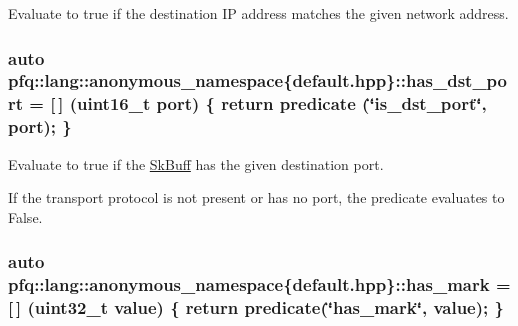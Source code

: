 Evaluate to {\ttfamily true} if the destination IP address matches the given network address. 

\subsubsection[{\texorpdfstring{has\+\_\+dst\+\_\+port}{has_dst_port}}]{\setlength{\rightskip}{0pt plus 5cm}auto pfq\+::lang\+::anonymous\+\_\+namespace\{default.\+hpp\}\+::has\+\_\+dst\+\_\+port = \mbox{[}$\,$\mbox{]} (uint16\+\_\+t {\bf port}) \{ return {\bf predicate} (\char`\"{}is\+\_\+dst\+\_\+port\char`\"{}, port); \}}\hypertarget{namespacepfq_1_1lang_1_1anonymous__namespace_02default_8hpp_03_afa71ece0f4178d0200c0388f503eef14}{}\label{namespacepfq_1_1lang_1_1anonymous__namespace_02default_8hpp_03_afa71ece0f4178d0200c0388f503eef14}


Evaluate to {\ttfamily true} if the \hyperlink{structpfq_1_1lang_1_1SkBuff}{Sk\+Buff} has the given destination port. 

If the transport protocol is not present or has no port, the predicate evaluates to False. 
\subsubsection[{\texorpdfstring{has\+\_\+mark}{has_mark}}]{\setlength{\rightskip}{0pt plus 5cm}auto pfq\+::lang\+::anonymous\+\_\+namespace\{default.\+hpp\}\+::has\+\_\+mark = \mbox{[}$\,$\mbox{]} (uint32\+\_\+t value) \{ return {\bf predicate}(\char`\"{}has\+\_\+mark\char`\"{}, value); \}}\hypertarget{namespacepfq_1_1lang_1_1anonymous__namespace_02default_8hpp_03_aa4ce1fdb0d99e1ca0afdf76619c58d12}{}\label{namespacepfq_1_1lang_1_1anonymous__namespace_02default_8hpp_03_aa4ce1fdb0d99e1ca0afdf76619c58d12}


